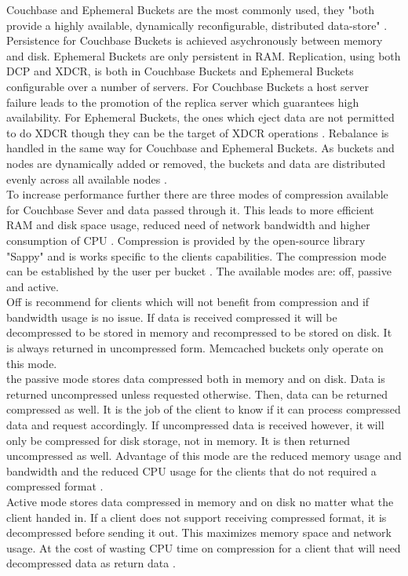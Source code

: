 Couchbase and Ephemeral Buckets are the most commonly used, they "both provide a highly available, dynamically reconfigurable, distributed data-store" \parencite{couchbaseDocuBuckets}. Persistence for Couchbase Buckets is achieved asychronously between memory and disk. Ephemeral Buckets are only persistent in RAM. Replication, using both DCP and XDCR, is both in Couchbase Buckets and Ephemeral Buckets configurable over a number of servers. For Couchbase Buckets a host server failure leads to the promotion of the replica server which guarantees high availability. For Ephemeral Buckets, the ones which eject data are not permitted to do XDCR though they can be the target of XDCR operations \parencite{couchbaseDocuBuckets}. Rebalance is handled in the same way for Couchbase and Ephemeral Buckets. As buckets and nodes are dynamically added or removed, the buckets and data are distributed evenly across all available nodes \parencite{couchbaseDocuBuckets}.\\
To increase performance further there are three modes of compression available for Couchbase Sever and data passed through it. This leads to more efficient RAM and disk space usage, reduced need of network bandwidth and higher consumption of CPU \parencite{couchbaseDocuCompression}. Compression is provided by the open-source library "Sappy" and is works specific to the clients capabilities. The compression mode can be established by the user per bucket \parencite{couchbaseDocuCompression}. The available modes are: off, passive and active.\\
Off is recommend for clients which will not benefit from compression and if bandwidth usage is no issue. If data is received compressed it will be decompressed to be stored in memory and recompressed to be stored on disk. It is always returned in uncompressed form. Memcached buckets only operate on this mode\parencite{couchbaseDocuCompression}. \\
the passive mode stores data compressed both in memory and on disk. Data is returned uncompressed unless requested otherwise. Then, data can be returned compressed as well. It is the job of the client to know if it can process compressed data and request accordingly. If uncompressed data is received however, it will only be compressed for disk storage, not in memory. It is then returned uncompressed as well. Advantage of this mode are the reduced memory usage and bandwidth and the reduced CPU usage for the clients that do not required a compressed format \parencite{couchbaseDocuCompression}.\\
Active mode stores data compressed in memory and on disk no matter what the client handed in. If a client does not support receiving compressed format, it is decompressed before sending it out. This maximizes memory space and network usage. At the cost of wasting CPU time on compression for a client that will need decompressed data as return data \parencite{couchbaseDocuCompression}.
